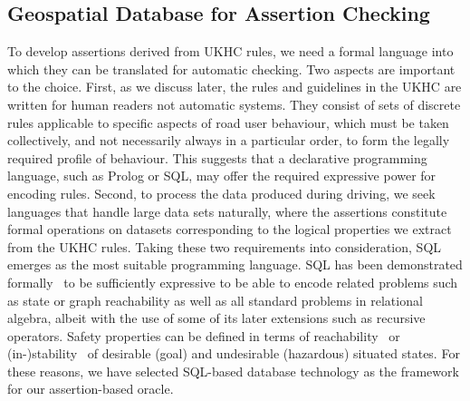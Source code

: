 








\subsection{Geospatial Database for Assertion Checking} \label{geospatial_database}
To develop assertions derived from UKHC rules, we need a formal language into which they can be translated for automatic checking. Two aspects are important to the choice. First, as we discuss later, the rules and guidelines in the UKHC are written for human readers not automatic systems. They consist of sets of discrete rules applicable to specific aspects of road user behaviour, which must be taken collectively, and not necessarily always in a particular order, to form the legally required profile of behaviour. This suggests that a declarative programming language, such as Prolog or SQL, may offer the required expressive power for encoding rules.
%
Second, to process the data produced during driving, we seek languages that handle large data sets naturally, where the assertions constitute formal operations on datasets corresponding to the logical properties we extract from the UKHC rules. 
%
Taking these two requirements into consideration, SQL emerges as the most suitable programming language. SQL has been demonstrated formally~\cite{sqllibkin} to be sufficiently expressive to be able to encode related problems such as state or graph reachability as well as all standard problems in relational algebra, albeit with the use of some of its later extensions such as recursive operators. Safety properties can be defined in terms of reachability~\cite{guiochet2015, masson2019} or (in-)stability~\cite{harper2005, xue2020} of desirable (goal) and undesirable (hazardous) situated states. For these reasons, we have selected SQL-based database technology as the framework for our assertion-based oracle. 

